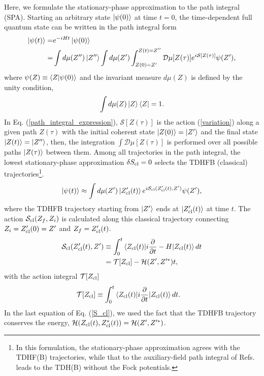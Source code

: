 \documentclass[11pt]{book} %
\begin{document}
Here, we formulate the stationary-phase approximation to the path integral (SPA). 
Starting an arbitrary state $\ket{\psi(0)}$ at time $t=0$,
the time-dependent full quantum state can be written in the path integral form
\begin{align}
\ket{\psi(t)}
	=& e^{-iHt} \ket{\psi(0)} \nonumber \\
	=& \int d\mu(Z'') \ket{Z''} \int d\mu(Z') \int_{Z(0)=Z'}^{Z(t)=Z''} \mathcal{D}\mu[Z(\tau)]
	e^{i\mathcal{S}[Z(\tau)]} \psi(Z') ,
\label{path_integral_expression}
\end{align}
where $\psi(Z)\equiv \braket{Z|\psi(0)}$ and
the invariant measure $d\mu(Z)$ is defined by 
the unity condition,
\begin{equation}
  \int d\mu(Z) \ket{Z}\bra{Z} = 1 .
  \label{unity}
\end{equation}
In Eq. (\ref{path_integral_expression}),
$\mathcal{S}[Z(\tau)]$ is the action (\ref{variation}) along a given path $Z(\tau)$
with the initial coherent state $\ket{Z(0)}=\ket{Z'}$ and
the final state $\ket{Z(t)}=\ket{Z''}$,
then, the integration $\int \mathcal {D}\mu[Z(\tau)]$
is performed over all possible paths $\ket{Z(\tau)}$ between them.
Among all trajectories in the path integral,
the lowest stationary-phase approximation $\delta S_{\rm cl}=0$ selects
the TDHFB (classical) trajectories\footnote{
In this formulation, the stationary-phase approximation agrees with
the TDHF(B) trajectories, while that to the auxiliary-field path
integral of Refs. \cite{Neg82,L80}
leads to the TDH(B) without the Fock potentials.
}.
\begin{equation}
	\ket{\psi(t)} \approx \int d\mu(Z') \ket{Z'_{\rm cl}(t)}
	e^{i\mathcal{S}_{\rm cl}(Z'_{\rm cl}(t),Z')} \psi(Z') ,
	\label{SPA}
\end{equation}
where the TDHFB trajectory starting from $\ket{Z'}$
ends at $\ket{Z'_{\rm cl}(t)}$ at time $t$.
The action $\mathcal{S}_{\rm cl}(Z_f,Z_i)$ is calculated along this
classical trajectory
connecting $Z_i=Z'_{\rm cl}(0)=Z'$ and $Z_f=Z'_{\rm cl}(t)$.
\begin{align}
	\mathcal{S}_{\rm cl}(Z'_{\rm cl}(t),Z') &\equiv \int_{0}^{t}
\braket{Z_{\rm cl}(t)|
	i\frac{\partial}{\partial t} - H
	|Z_{\rm cl}(t)} dt \nonumber \\
	&= \mathcal{T}[Z_{\rm cl}] - \mathcal{H}(Z',Z'^*) t 
	,
	\label{S_cl}
\end{align}
with the action integral $\mathcal{T}[Z_{\rm cl}]$
\begin{align}
\mathcal{T}[Z_{\rm cl}] &\equiv
\int_{0}^{t} \braket{Z_{\rm cl}(t)| i\frac{\partial}{\partial t}
	|Z_{\rm cl}(t)} dt  .
\end{align}
In the last equation of Eq. (\ref{S_cl}),
we used the fact that the TDHFB trajectory conserves the energy,
$\mathcal{H}(Z_{\rm cl}(t),Z_{\rm cl}^*(t))= \mathcal{H}(Z',Z'^*)$.
\end{document}
